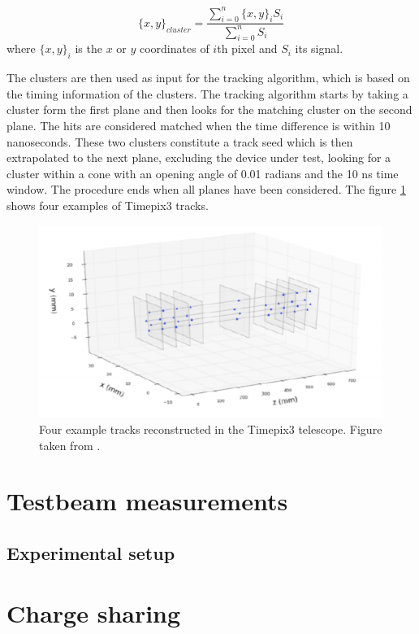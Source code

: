 \begin{equation}
    \{x,y\}_{cluster} = \frac{\sum_{i = 0}^{n} \{x,y\}_{i} S_{i}}{\sum_{i = 0}^{n} S_{i}} 
\end{equation}
where $\{x,y\}_{i} $ is the $x$ or $y$  coordinates of $i$th pixel and $S_i$ its signal. 

The clusters are then used as input for the tracking algorithm, which is based on the timing information of the clusters.  The tracking algorithm starts by taking a cluster form the first plane and then looks for the matching cluster on the second plane. The hits are considered matched when the time difference is within 10 nanoseconds. These two clusters constitute a track seed which is then extrapolated to the next plane, excluding the device under test, looking for a cluster within a cone with an opening angle of 0.01 radians and the 10 ns time window. The procedure ends when all planes have been considered. The figure \ref{fig:telescope_tracks} shows four examples of Timepix3 tracks. 



\begin{figure}
\centering
\includegraphics[scale=0.9]{figures/telescope_tracks.png}
\caption{Four example tracks reconstructed in the Timepix3 telescope. Figure taken from \cite{Sophie}.}
\label{fig:telescope_tracks}
\end{figure}


\section{Testbeam measurements}

\subsection{Experimental setup}


\section{Charge sharing}


